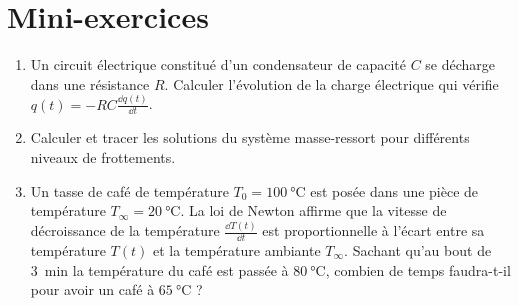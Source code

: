  \section*{Mini-exercices}

\begin{frame}
\begin{miniexercice}
\begin{enumerate}
  \item Un circuit électrique constitué d'un condensateur 
  de capacité $C$ se décharge dans une résistance $R$.
  Calculer l'évolution de la charge électrique qui vérifie
  $q(t) = -RC \frac{\dd q(t)}{\dd t}$.
  
  \item Calculer et tracer les solutions du système masse-ressort
  pour différents niveaux de frottements.
  
  \item Un tasse de café de température $T_0= \SI{100}{\celsius}$
  est posée dans une pièce de température $T_\infty = \SI{20}{\celsius}$.
  La loi de Newton affirme que la vitesse de décroissance de la température
  $\frac{\dd T(t)}{\dd t}$ est proportionnelle à l'écart entre sa température
  $T(t)$ et la température ambiante $T_\infty$.
  Sachant qu'au bout de \SI{3}{\minute} la température du café 
  est passée à $\SI{80}{\celsius}$, combien de temps faudra-t-il 
  pour avoir un café à $\SI{65}{\celsius}$ ?
\end{enumerate}
\end{miniexercice}
\end{frame}





